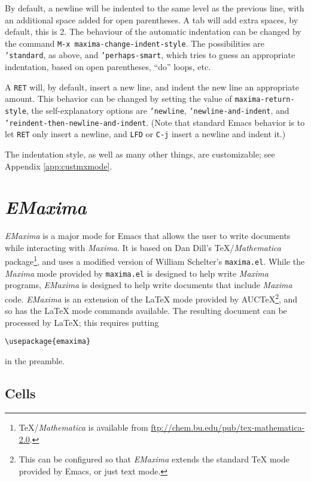 \documentclass{article}
\newcommand{\emx}{\textsl{\sffamily EMaxima}}
\newcommand{\mx}{\textsl{\sffamily Maxima}}
\begin{document}
By default, a newline will be indented to the same level as the
previous line, with an additional space added for open parentheses.  A
tab will add extra spaces, by default, this is 2.  The behaviour of
the automatic indentation can be changed by the command \texttt{M-x
  maxima-change-indent-style}.  The possibilities are
\texttt{'standard}, as above, and \texttt{'perhaps-smart}, which tries
to guess an appropriate indentation, based on open parentheses, ``do''
loops, etc.

A \texttt{RET} will, by default, insert a new line, and indent the new
line an appropriate amount.  This behavior can be changed by setting
the value of 
\texttt{maxima-return-style}, the self-explanatory options are
\texttt{'newline}, \texttt{'newline-and-indent}, and
\texttt{'reindent-then-newline-and-indent}.  (Note that standard Emacs
behavior is to let \texttt{RET} only insert a newline, and
\texttt{LFD} or \texttt{C-j} insert a newline and indent it.)

The indentation style, as well as many other things, are customizable;
see Appendix \ref{app:custmxmode}.


\section{\emx}

\emx{} is a major mode for Emacs that allows the user to write
documents while interacting with \mx.  It is based on Dan Dill's
\TeX{}/\textit{Mathematica} package\footnote{\TeX/\textit{Mathematica}
  is available from \url{ftp://chem.bu.edu/pub/tex-mathematica-2.0}.},
and uses a modified version of William Schelter's \texttt{maxima.el}.
While the \mx{} mode provided by \texttt{maxima.el} is designed to
help write \mx{} programs, \emx{} is designed to help write documents
that include \mx{} code.  \emx{} is an extension of the \LaTeX{} mode
provided by AUC\TeX{}\footnote{This can be configured so that \emx{}
  extends the standard \TeX{} mode provided by Emacs, or just text
  mode.}, and so has the \LaTeX{} mode commands available.  The
resulting document can be processed by \LaTeX{}; this requires putting
\begin{verbatim}
\usepackage{emaxima}
\end{verbatim}
\noindent
in the preamble.

\subsection{Cells}
\end{document}
